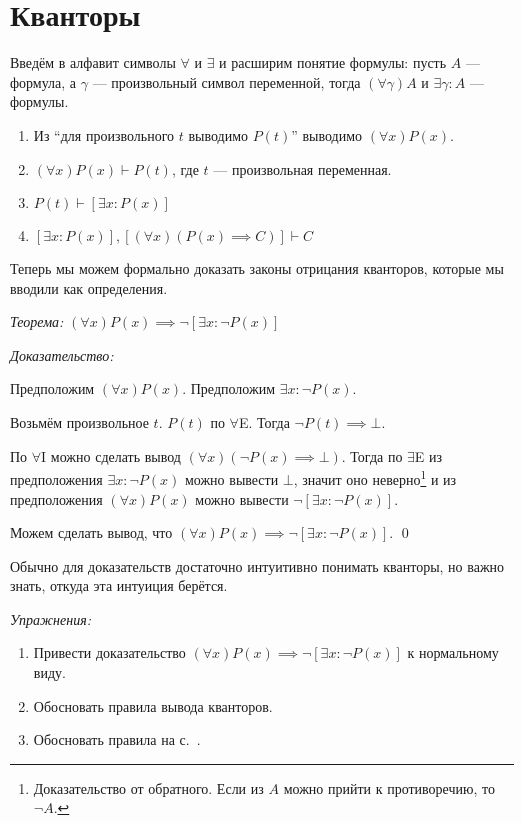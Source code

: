\section{Кванторы}

Введём в алфавит символы $\forall$ и $\exists$ и расширим понятие формулы:
пусть $A$ --- формула, а $\gamma$ --- произвольный символ переменной,
тогда $(\forall\gamma)A$ и $\exists\gamma:A$ --- формулы.

\newcommand\Aii{$\forall$I}
\newcommand\Aee{$\forall$E}
\newcommand\Eii{$\exists$I}
\newcommand\Eee{$\exists$E}
\begin{enumerate}
	\item[(\Aii)]{}Из ``для произвольного $t$ выводимо $P(t)$''
	выводимо $(\forall x)P(x)$.
	\item[(\Aee)]{}$(\forall x)P(x)\vdash P(t)$, где $t$ --- произвольная переменная.
	\item[(\Eii)]{}$P(t)\vdash [\exists x:P(x)]$
	\item[(\Eee)]{}$[\exists x:P(x)], [(\forall x)(P(x)\implies C)]\vdash C$
\end{enumerate}

Теперь мы можем формально доказать законы отрицания кванторов,
которые мы вводили как определения.

{\it Теорема:}
$(\forall x)P(x)\implies \lnot[\exists x:\lnot P(x)]$

{\it Доказательство:}

Предположим $(\forall x)P(x)$. Предположим $\exists x:\lnot P(x)$.

Возьмём произвольное $t$. $P(t)$ по \Aee. Тогда $\lnot P(t)\implies\bot$.

По \Aii{} можно сделать вывод $(\forall x)(\lnot P(x)\implies\bot)$.
Тогда по \Eee{} из предположения ${\exists x:\lnot P(x)}$ можно вывести $\bot$,
значит оно неверно\footnote{
	Доказательство от обратного. Если из $A$ можно прийти к противоречию, то $\lnot A$.
} и из предположения $(\forall x)P(x)$
можно вывести $\lnot[\exists x:\lnot P(x)]$.

Можем сделать вывод, что $(\forall x)P(x)\implies \lnot[\exists x:\lnot P(x)]$.
\qed

Обычно для доказательств достаточно интуитивно понимать кванторы,
но важно знать, откуда эта интуиция берётся.

{\it Упражнения:}

\begin{enumerate}
	\item{}Привести доказательство ${(\forall x)P(x)\implies \lnot[\exists x:\lnot P(x)]}$
	к нормальному виду.
	\item{}Обосновать правила вывода кванторов.
	\item{}Обосновать правила на с.~\pageref{deduction_rules}.
\end{enumerate}

